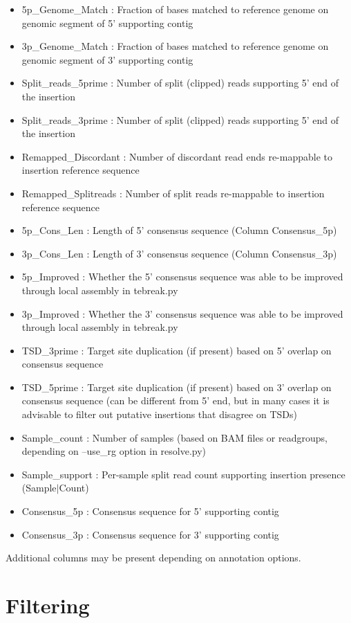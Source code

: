 \documentclass[letterpaper,11pt]{article}
\begin{document}
\begin{itemize}
\item 5p\_Genome\_Match : Fraction of bases matched to reference genome on genomic segment of 5' supporting contig
\item 3p\_Genome\_Match : Fraction of bases matched to reference genome on genomic segment of 3' supporting contig
\item Split\_reads\_5prime : Number of split (clipped) reads supporting 5' end of the insertion
\item Split\_reads\_3prime : Number of split (clipped) reads supporting 5' end of the insertion
\item Remapped\_Discordant : Number of discordant read ends re-mappable to insertion reference sequence
\item Remapped\_Splitreads : Number of split reads re-mappable to insertion reference sequence
\item 5p\_Cons\_Len : Length of 5' consensus sequence (Column Consensus\_5p)
\item 3p\_Cons\_Len : Length of 3' consensus sequence (Column Consensus\_3p)
\item 5p\_Improved : Whether the 5' consensus sequence was able to be improved through local assembly in tebreak.py
\item 3p\_Improved : Whether the 3' consensus sequence was able to be improved through local assembly in tebreak.py
\item TSD\_3prime : Target site duplication (if present) based on 5' overlap on consensus sequence
\item TSD\_5prime : Target site duplication (if present) based on 3' overlap on consensus sequence (can be different from 5' end, but in many cases it is advisable to filter out putative insertions that disagree on TSDs)
\item Sample\_count : Number of samples (based on BAM files or readgroups, depending on --use\_rg option in resolve.py)
\item Sample\_support : Per-sample split read count supporting insertion presence (Sample$\vert$Count)
\item Consensus\_5p : Consensus sequence for 5' supporting contig
\item Consensus\_3p : Consensus sequence for 3' supporting contig
\end{itemize}

Additional columns may be present depending on annotation options.

\section{Filtering}
\end{document}
